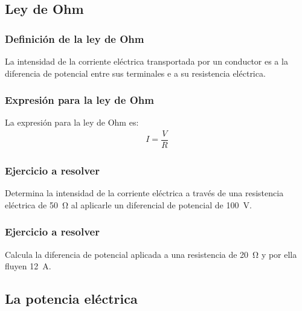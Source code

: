 \documentclass[14pt]{beamer}
\begin{document}
\subsection{Ley de Ohm}


\begin{frame}
\frametitle{Definición de la ley de Ohm}
La intensidad de la corriente eléctrica transportada por un conductor es  a la diferencia de potencial entre sus terminales \pause e  a su resistencia eléctrica.
\end{frame}
\begin{frame}
\frametitle{Expresión para la ley de Ohm}
La expresión para la ley de Ohm es:
\pause
\begin{align*}
I = \dfrac{V}{R}
\end{align*}
\end{frame}
\begin{frame}
\frametitle{Ejercicio a resolver}
Determina la intensidad de la corriente eléctrica a través de una resistencia eléctrica de \SI{50}{\ohm} al aplicarle un diferencial de potencial de \SI{100}{\volt}.
\end{frame}
\begin{frame}
\frametitle{Ejercicio a resolver}
Calcula la diferencia de potencial aplicada a una resistencia de \SI{20}{\ohm} y por ella fluyen \SI{12}{\ampere}.
\end{frame}

\subsection{La potencia eléctrica}
\end{document}
